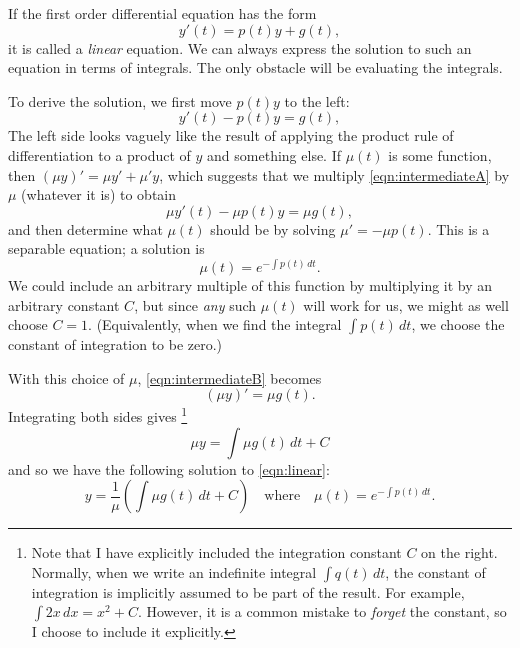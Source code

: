 \documentclass[reqno]{immbook}
\numberwithin{equation}{chapter}
\numberwithin{question}{section}
\numberwithin{theorem}{chapter}
\numberwithin{figure}{chapter}
\theoremstyle{definition}
\begin{document}
If the first order differential equation has the form
\begin{equation}
    y'(t) = p(t) y + g(t),
\label{eqn:linear}
\end{equation}
it is called a \emph{linear} equation.
We can always express the solution to such an equation
in terms of integrals.  The only obstacle will be
evaluating the integrals.

To derive the solution, we first move $p(t)y$ to the left:
\begin{equation}
    y'(t) - p(t) y =  g(t),
\label{eqn:intermediateA}
\end{equation}
The left side looks vaguely like the result of applying the
product rule of differentiation to a product of $y$ and something else.
If $\mu(t)$ is some function, then $(\mu y)' = \mu y' + \mu' y$,
which suggests that we multiply \eqref{eqn:intermediateA}
by $\mu$ (whatever it is)
to obtain
\begin{equation}
    \mu y'(t) - \mu p(t) y =  \mu g(t),
\label{eqn:intermediateB}
\end{equation}
and then determine what $\mu(t)$ should
be by solving $\mu' = -\mu p(t)$.
This is a separable equation; a solution is
\begin{equation}
   \mu(t) = e^{-\int p(t)\, dt}.
\end{equation}
We could include an arbitrary multiple of this function
by multiplying it by an arbitrary constant $C$, but
since \emph{any} such $\mu(t)$ will work for us, we
might as well choose $C=1$.
(Equivalently, when we find the integral
$\int p(t)\,dt$, we choose the constant of integration
to be zero.)

With this choice of $\mu$, 
\eqref{eqn:intermediateB} becomes
\begin{equation}
    (\mu y)' =  \mu g(t).
\label{eqn:intermediateC}
\end{equation}
Integrating both sides gives%
\footnote{Note that I have explicitly included the integration
constant $C$ on the right.  Normally, when we write an indefinite
integral $\int q(t)\, dt$, the constant of integration is implicitly
assumed to be part of the result. For example, $\int 2x\,dx = x^2+C$.
However, it is a common mistake to \emph{forget} the constant, so
I choose to include it explicitly.}
\begin{equation}
    \mu y =  \int \mu g(t) \, dt + C
\label{eqn:intermediateD}
\end{equation}
and so we have the following solution
to \eqref{eqn:linear}:
\begin{equation}
    y =  \frac{1}{\mu}\left(\int \mu g(t) \, dt + C\right)
    \quad \textrm{where} \quad
    \mu(t) = e^{-\int p(t)\, dt}.
\label{eqn:linearsolution}
\end{equation}
\end{document}
